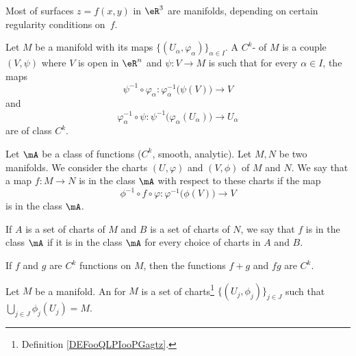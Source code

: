 Most of surfaces $z=f(x,y)$ in $\eR^3$ are manifolds, depending on certain regularity conditions on~$f$.

\begin{definition}       \label{DEFooQLPIooPGagtz}
	Let \( M\) be a manifold with its maps \(  \{ (U_{\alpha}, \varphi_{\alpha}) \}_{\alpha\in I}   \). A \( C^k\)- of \( M\) is a couple \( (V,\psi)\) where \( V\) is open in \( \eR^n\) and \( \psi\colon V\to M\) is such that for every \( \alpha\in I\), the maps
	\begin{equation}
		\psi^{-1}\circ \varphi_{\alpha}\colon \varphi_{\alpha}^{-1}\big( \psi(V) \big)\to V
	\end{equation}
	and
	\begin{equation}
		\varphi_{\alpha}^{-1}\circ \psi\colon \psi^{-1}\big( \varphi_{\alpha}(U_{\alpha}) \big)\to U_{\alpha}
	\end{equation}
	are of class \( C^k\).
\end{definition}

\begin{definition}       \label{DEFooUFHTooTXUVpN}
	Let \( \mA\) be a class of functions (\( C^k\), smooth, analytic). Let \( M,N\) be two manifolds. We consider the charts \( (U,\varphi)\) and \( (V,\phi)\) of \( M\) and \( N\). We say that a map \(f\colon M\to N \) is in the class \( \mA\) with respect to these charts if the map
	\begin{equation}
		\phi^{-1}\circ f\circ\varphi\colon \varphi^{-1}\big( \phi(V) \big)\to V
	\end{equation}
	is in the class \( \mA\).

	If \( A\) is a set of charts of \( M\) and \( B\) is a set of charts of \( N\), we say that \( f\) is in the class \( \mA\) if it is in the class \( \mA\) for every choice of charts in \( A\) and \( B\).
\end{definition}

\begin{proposition}		\label{PROPooCWPAooKDnwHR}
	If \( f\) and \( g\) are \( C^k\) functions on \( M\), then the functions \( f+g\) and \( fg\) are \( C^k\).
\end{proposition}
\noproof


\begin{definition}       \label{DEFooMLNQooEgEfdq}
	Let \( M\) be a manifold. An  for \( M\) is a set of charts\footnote{Definition \ref{DEFooQLPIooPGagtz}.} \( \{  (U_j,\phi_j)  \}_{j\in J}\) such that \( \bigcup_{j\in J}\phi_j(U_j)=M\).
\end{definition}

